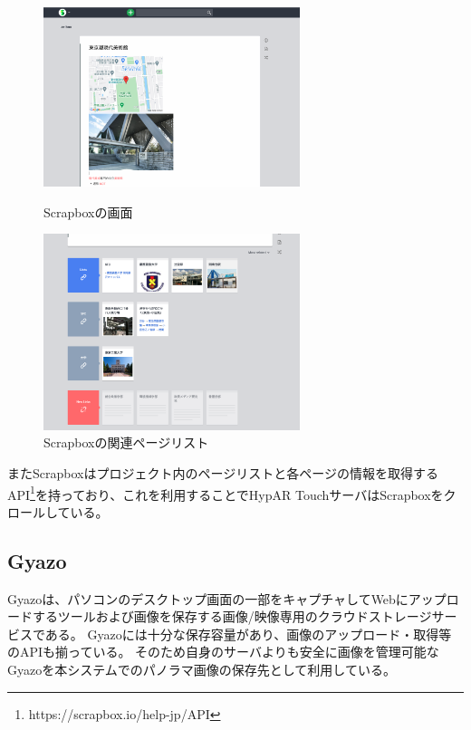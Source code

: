 \begin{figure}[h]
  \begin{minipage}{0.5\hsize}
    \centering
    \includegraphics[width=75mm]{images/scrapbox_screen.png}
    \caption{Scrapboxの画面} \label{fig:scrapbox}
  \end{minipage}
  \begin{minipage}{0.5\hsize}
    \centering
    \includegraphics[width=75mm]{images/scrapbox_related_screen.png}
    \caption{Scrapboxの関連ページリスト} \label{fig:scrapbox_related}
  \end{minipage}
\end{figure}
またScrapboxはプロジェクト内のページリストと各ページの情報を取得するAPI\footnote{\textsf{https://scrapbox.io/help-jp/API}}を持っており、これを利用することでHypAR TouchサーバはScrapboxをクロールしている。

\subsection{Gyazo}
Gyazoは、パソコンのデスクトップ画面の一部をキャプチャしてWebにアップロードするツールおよび画像を保存する画像/映像専用のクラウドストレージサービスである。
Gyazoには十分な保存容量があり、画像のアップロード・取得等のAPIも揃っている。
そのため自身のサーバよりも安全に画像を管理可能なGyazoを本システムでのパノラマ画像の保存先として利用している。

